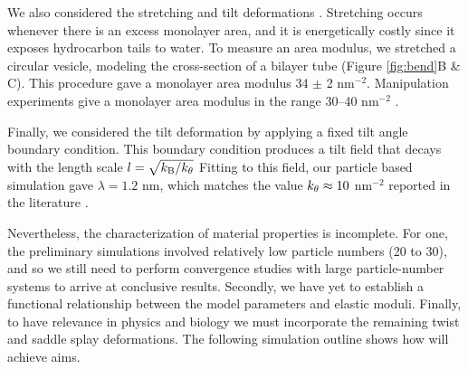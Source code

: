 We also considered the stretching and tilt deformations \cite{Fu2018_SIAM}. 
Stretching occurs whenever there is an excess monolayer area,
and it is energetically costly since it exposes hydrocarbon tails to water.
To measure an area modulus, we stretched a circular vesicle, modeling the cross-section 
of a bilayer tube (Figure \ref{fig:bend}B \& C).
This procedure gave a monolayer area modulus 
34 $\pm$ 2 \kBT \;nm$^{-2}$. Manipulation experiments give a monolayer area modulus in the range 
30--40 \kBT\; nm$^{-2}$ \cite{Nagle17, Nagle17-2}. 

Finally, we considered the tilt deformation by applying a fixed tilt angle boundary condition. 
This boundary condition produces a tilt field that decays with the length scale $l = \sqrt{k_{\mathrm{B}}/k_{\theta}}$ 
Fitting to this field, our particle based simulation gave $\lambda = 1.2$ nm, which matches
the value $k_{\theta} \approx 10$ \kBT \; nm$^{-2}$ reported in the literature \cite{KUZMIN2005, KoNa15}.



Nevertheless, the characterization of material properties is incomplete. For one, the preliminary simulations involved relatively low particle numbers (20 to 30), and so we still need to
perform convergence studies with large particle-number systems to arrive at conclusive results. Secondly, we have yet to establish a functional
relationship between the model parameters and elastic moduli.
Finally, to have relevance in physics and biology we must incorporate the remaining twist and saddle splay deformations.
The following simulation outline shows how will achieve aims.

